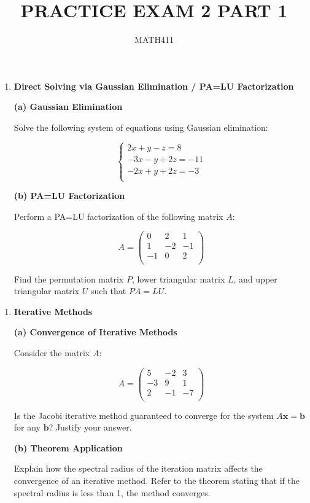 \documentclass[
]{article}
\title{PRACTICE EXAM 2 PART 1}
\subtitle{MATH411}
\author{}
\date{}
\begin{document}
\maketitle


\begin{enumerate}
\def\labelenumi{\arabic{enumi}.}
\item
  \textbf{Direct Solving via Gaussian Elimination / PA=LU Factorization}

  \textbf{(a) Gaussian Elimination}

  Solve the following system of equations using Gaussian elimination:

  \[
  \begin{cases}
  2x + y - z = 8 \\
  -3x - y + 2z = -11 \\
  -2x + y + 2z = -3 \\
  \end{cases}
  \]

  \vspace{5cm}

  \textbf{(b) PA=LU Factorization}

  Perform a PA=LU factorization of the following matrix \(A\):

  \[
  A = \begin{pmatrix}
  0 & 2 & 1 \\
  1 & -2 & -1 \\
  -1 & 0 & 2 \\
  \end{pmatrix}
  \]

  Find the permutation matrix \(P\), lower triangular matrix \(L\), and
  upper triangular matrix \(U\) such that \(PA = LU\).
\end{enumerate}

\newpage

\begin{enumerate}
\def\labelenumi{\arabic{enumi}.}
\setcounter{enumi}{1}
\item
  \textbf{Iterative Methods}

  \textbf{(a) Convergence of Iterative Methods}

  Consider the matrix \(A\):

  \[
  A = \begin{pmatrix}
  5 & -2 & 3 \\
  -3 & 9 & 1 \\
  2 & -1 & -7 \\
  \end{pmatrix}
  \]

  Is the Jacobi iterative method guaranteed to converge for the system
  \(A\mathbf{x} = \mathbf{b}\) for any \(\mathbf{b}\)? Justify your
  answer.

  \vspace{6cm}

  \textbf{(b) Theorem Application}

  Explain how the spectral radius of the iteration matrix affects the
  convergence of an iterative method. Refer to the theorem stating that
  if the spectral radius is less than 1, the method converges.
\end{enumerate}
\end{document}

